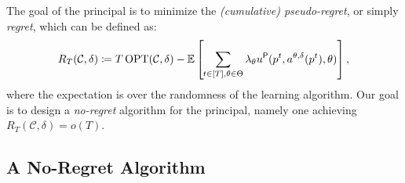 %
%
%
The goal of the principal is to minimize the \emph{(cumulative) pseudo-regret}, or simply \emph{regret}, which can be defined as:
%
\begin{align*}
	R_T(\mathcal{C},\delta) \coloneqq  T \, \textnormal{OPT}(\mathcal{C},{\delta})-   \mathbb{E} \left[\hspace{-0.2mm}\sum_{t \in [T],\theta \in \Theta} \lambda_\theta u^{\mathsf{P}}(p^t, a^{\theta,\delta}(p^t),\theta)  \right] ,
\end{align*}
%
where the expectation is over the randomness of the learning algorithm.
%
%
Our goal is to design a \emph{no-regret} algorithm for the principal, namely one achieving $R_T(\mathcal{C}, \delta) = o(T)$.



\subsection{A No-Regret Algorithm}\label{sec:no_regret}

